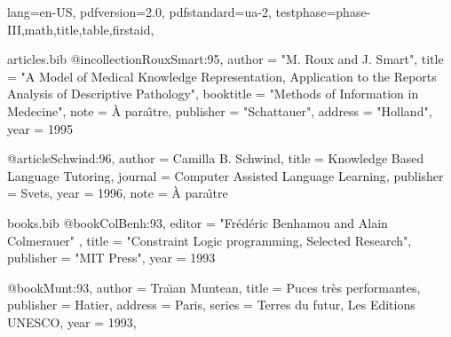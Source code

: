 \DocumentMetadata
  {
    lang=en-US,
    pdfversion=2.0,
    pdfstandard=ua-2,
    testphase={phase-III,math,title,table,firstaid},
  }
\begin{filecontents}{articles.bib}
@incollection{RouxSmart:95,
    author    = "M. Roux and J. Smart",
    title     = "A Model of Medical Knowledge Representation, Application
                 to the Reports Analysis of Descriptive Pathology",
    booktitle = "Methods of Information in Medecine",
    note      = {\`A para\^{\i}tre},
    publisher = "Schattauer",
    address   = "Holland",
    year      = 1995
}

@article{Schwind:96,
    author    = {Camilla B. Schwind},
    title     = {Knowledge Based Language Tutoring},
    journal   = {Computer Assisted Language Learning},
    publisher = {Svets},
    year      = 1996,
    note      = {\`A para\^{\i}tre}
}
\end{filecontents}
\begin{filecontents}{books.bib}
@book{ColBenh:93,
   editor = "Fr\'ed\'eric Benhamou and Alain Colmerauer" ,
   title = "Constraint Logic programming, Selected Research",
   publisher = "MIT Press",
   year = 1993
}

@book{Munt:93,
   author =    {Tra{\"\i}an Muntean},
   title =     {Puces tr\`es performantes},
   publisher = {Hatier},
   address =   {Paris},
   series = {Terres du futur, Les Editions UNESCO},
   year =      1993,
}
\end{filecontents}

\documentclass[10pt]{article}
\usepackage{bibtopic}
\usepackage{hyperref}



\section{Testing}
Let's cite all the books: \cite{ColBenh:93} and
\cite{Munt:93}; and an article: \cite{RouxSmart:95}.

\begin{btSect}{books}
\section{References from books}
\btPrintCited
\end{btSect}

\begin{btSect}[plain]{articles}
\section{References from articles}
\btPrintCited

\section{Articles not cited}
\btPrintNotCited
\end{btSect}
